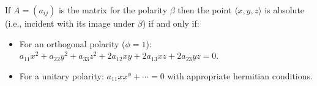 If $A = (a_{ij})$ is the matrix for the polarity $\beta$ then the point $\langle x, y, z \rangle$ is absolute (i.e., incident with its image under $\beta$) if and only if:
\begin{itemize}
\item For an orthogonal polarity ($\phi = 1$): $a_{11}x^2 + a_{22}y^2 + a_{33}z^2 + 2a_{12}xy + 2a_{13}xz + 2a_{23}yz = 0$.
\item For a unitary polarity: $a_{11}x x^\phi + \cdots = 0$ with appropriate hermitian conditions.
\end{itemize}

